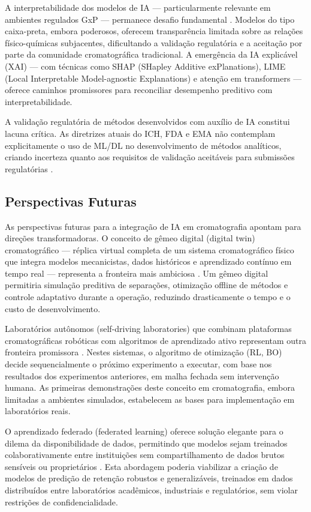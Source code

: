 \documentclass[preprint,12pt]{elsarticle}
\begin{document}
A interpretabilidade dos modelos de IA — particularmente relevante em ambientes regulados GxP — permanece desafio fundamental \cite{sulthana2026}. Modelos do tipo caixa-preta, embora poderosos, oferecem transparência limitada sobre as relações físico-químicas subjacentes, dificultando a validação regulatória e a aceitação por parte da comunidade cromatográfica tradicional. A emergência da IA explicável (XAI) — com técnicas como SHAP (SHapley Additive exPlanations), LIME (Local Interpretable Model-agnostic Explanations) e atenção em transformers — oferece caminhos promissores para reconciliar desempenho preditivo com interpretabilidade.

A validação regulatória de métodos desenvolvidos com auxílio de IA constitui lacuna crítica. As diretrizes atuais do ICH, FDA e EMA não contemplam explicitamente o uso de ML/DL no desenvolvimento de métodos analíticos, criando incerteza quanto aos requisitos de validação aceitáveis para submissões regulatórias \cite{rahman2021, sulthana2026}.

\subsection{Perspectivas Futuras}

As perspectivas futuras para a integração de IA em cromatografia apontam para direções transformadoras. O conceito de gêmeo digital (digital twin) cromatográfico — réplica virtual completa de um sistema cromatográfico físico que integra modelos mecanicistas, dados históricos e aprendizado contínuo em tempo real — representa a fronteira mais ambiciosa \cite{mouellef2021}. Um gêmeo digital permitiria simulação preditiva de separações, otimização offline de métodos e controle adaptativo durante a operação, reduzindo drasticamente o tempo e o custo de desenvolvimento.

Laboratórios autônomos (self-driving laboratories) que combinam plataformas cromatográficas robóticas com algoritmos de aprendizado ativo representam outra fronteira promissora \cite{niezen2025, boelrijk2023}. Nestes sistemas, o algoritmo de otimização (RL, BO) decide sequencialmente o próximo experimento a executar, com base nos resultados dos experimentos anteriores, em malha fechada sem intervenção humana. As primeiras demonstrações deste conceito em cromatografia, embora limitadas a ambientes simulados, estabelecem as bases para implementação em laboratórios reais.

O aprendizado federado (federated learning) oferece solução elegante para o dilema da disponibilidade de dados, permitindo que modelos sejam treinados colaborativamente entre instituições sem compartilhamento de dados brutos sensíveis ou proprietários \cite{szucs2023}. Esta abordagem poderia viabilizar a criação de modelos de predição de retenção robustos e generalizáveis, treinados em dados distribuídos entre laboratórios acadêmicos, industriais e regulatórios, sem violar restrições de confidencialidade.
\end{document}
